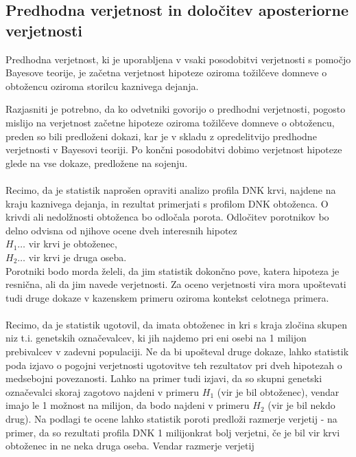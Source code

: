 \documentclass[fin1, tisk]{fmfdelo}
\theoremstyle{definition}
\theoremstyle{trditev}
\theoremstyle{izrek}
\begin{document}
\subsection{Predhodna verjetnost in določitev aposteriorne verjetnosti}
\begin{definicija}
    Predhodna verjetnost, ki je uporabljena v vsaki posodobitvi verjetnosti s pomočjo Bayesove teorije, je začetna verjetnost hipoteze 
    oziroma tožilčeve domneve o obtožencu oziroma storilcu kaznivega dejanja.
\end{definicija}
Razjasniti je potrebno, da ko odvetniki govorijo o predhodni verjetnosti, pogosto mislijo na verjetnost začetne hipoteze oziroma tožilčeve 
domneve o obtožencu, preden so bili predloženi dokazi, kar je v skladu z opredelitvijo predhodne verjetnosti v Bayesovi teoriji. Po končni 
posodobitvi dobimo verjetnost hipoteze glede na vse dokaze, predložene na sojenju.\\\\
Recimo, da je statistik naprošen opraviti analizo profila DNK krvi, najdene na kraju kaznivega dejanja, in rezultat primerjati s 
profilom DNK obtoženca. O krivdi ali nedolžnosti obtoženca bo odločala porota. Odločitev porotnikov bo delno odvisna od njihove ocene dveh 
interesnih hipotez\\
$H_1 \dots$ vir krvi je obtoženec,\\
$H_2 \dots$ vir krvi je druga oseba.\\
Porotniki bodo morda želeli, da jim statistik dokončno pove, katera hipoteza je resnična, ali da jim navede verjetnosti. 
Za oceno verjetnosti vira mora upoštevati tudi druge dokaze v kazenskem primeru oziroma kontekst celotnega primera.\\\\
Recimo, da je statistik ugotovil, da imata obtoženec in kri s kraja zločina skupen niz t.i. genetskih označevalcev, ki jih 
najdemo pri eni osebi na 1 milijon prebivalcev v zadevni populaciji. Ne da bi upošteval druge dokaze, lahko statistik poda 
izjavo o pogojni verjetnosti ugotovitve teh rezultatov pri dveh hipotezah o medsebojni povezanosti. Lahko na primer tudi izjavi, da so 
skupni genetski označevalci skoraj zagotovo najdeni v primeru $H_1$ (vir je bil obtoženec), vendar imajo le 1 možnost na milijon, da bodo 
najdeni v primeru $H_2$ (vir je bil nekdo drug). Na podlagi te ocene lahko statistik poroti predloži razmerje verjetij - na 
primer, da so rezultati profila DNK 1 milijonkrat bolj verjetni, če je bil vir krvi obtoženec in ne neka druga oseba. Vendar razmerje verjetij 
\end{document}
